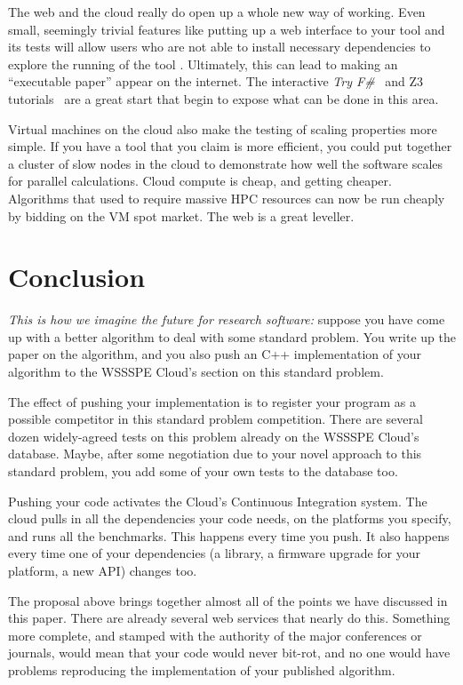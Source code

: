 \documentclass[conference]{IEEEtran}
\begin{document}
The web and the cloud really do open up a whole new way of
working. Even small, seemingly trivial features like putting up a web
interface to your tool and its tests will allow users who are not
able to install necessary dependencies to explore the running of the
tool \cite{Hall2014}. Ultimately, this can lead to making an
``executable paper'' appear on the internet. The interactive {\em Try
  F\#}~\cite{tryFsharp} and Z3 tutorials~\cite{Z3tutorial} are a great
start that begin to expose what can be done in this area.

Virtual machines on the cloud also make the testing of scaling
properties more simple.  If you have a tool that you claim is more
efficient, you could put together a cluster of slow nodes in the cloud
to demonstrate how well the software scales for parallel calculations.
Cloud compute is cheap, and getting cheaper. Algorithms that used to
require massive HPC resources can now be run cheaply by bidding on the
VM spot market. The web is a great leveller.


\section{Conclusion}
\label{sec:Conclusion} 

{\emph{This is how we imagine the future for research software:}} suppose you
have come up with a better algorithm to deal with some standard
problem.  You write up the paper on the algorithm, and you also push
an C++ implementation of your algorithm to the WSSSPE Cloud's section
on this standard problem.

The effect of pushing your implementation is to register your program
as a possible competitor in this standard problem competition. There
are several dozen widely-agreed tests on this problem already on the
WSSSPE Cloud's database. Maybe, after some negotiation due to your
novel approach to this standard problem, you add some of your
own tests to the database too.

Pushing your code activates the Cloud's Continuous Integration
system.  The cloud pulls in all the dependencies your code needs, on
the platforms you specify, and runs all the benchmarks. This happens
every time you push. It also happens every time one of your
dependencies (a library, a firmware upgrade for your platform, a new
API) changes too.

The proposal above brings together almost all of the points we have
discussed in this paper. There are already several web services that
nearly do this. Something more complete, and stamped with the
authority of the major conferences or journals, would mean that your
code would never bit-rot, and no one would have problems reproducing
the implementation of your published algorithm.




\end{document}
